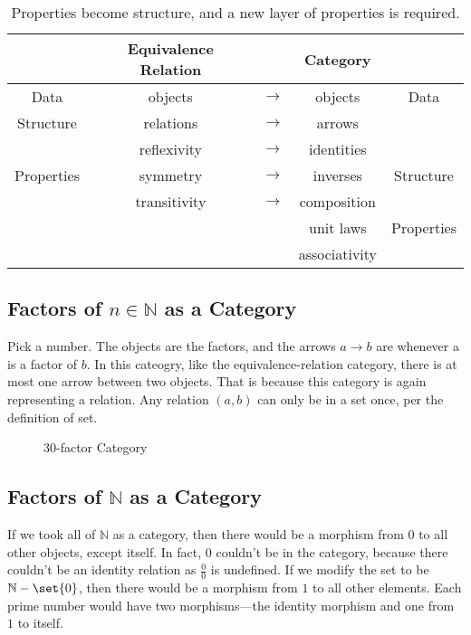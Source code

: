 \begin{table}
    \centering %
    \begin{tabular}{ ccccc } %
    \hline
    & Equivalence Relation & & Category & \\ \hline
    Data & objects & $\rightarrow$ & objects& Data\\
    Structure & relations & $\rightarrow$ & arrows & \\ \hline
    & reflexivity & $\rightarrow$ & identities & \\
    Properties & symmetry & $\rightarrow$ & inverses & Structure \\
    & transitivity & $\rightarrow$ & composition & \\\hline
    & & & unit laws& Properties \\
    & & & associativity &
    \\\hline
    \end{tabular}
    \caption{Properties become structure, and a new layer of properties is required.}
\end{table}
\subsection{Factors of $n\in\mathbb{N}$ as a Category}
Pick a number. The objects are the factors, and the arrows $a\rightarrow b$ are
whenever a is a factor of $b$. In this cateogry, like the equivalence-relation
category, there is at most one arrow between two objects. That is because this
category is again representing a relation. Any relation $(a, b)$ can only be in
a set once, per the definition of set.
\begin{figure}[H]
\caption{30-factor Category}
\end{figure}
\subsection{Factors of $\mathbb{N}$ as a Category}
If we took all of $\mathbb{N}$ as a category, then there would be a morphism
from $0$ to all other objects, except itself. In fact, $0$ couldn't be in the
category, because there couldn't be an identity relation as $\frac{0}{0}$ is
undefined. If we modify the set to be $\mathbb{N} - \set{0}$, then there would
be a morphism from $1$ to all other elements. Each prime number would have two
morphisms---the identity morphism and one from $1$ to itself.
